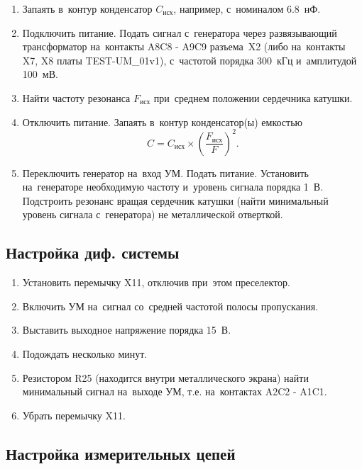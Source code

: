 \begin{enumerate}
	\item Запаять в~контур конденсатор $C_{\text{исх}}$, например, с~номиналом 6.8~нФ.
	\item Подключить питание. Подать сигнал с~генератора через развязывающий трансформатор на~контакты A8C8 - A9C9 разъема~X2 (либо на~контакты X7, X8 платы TEST-UM\_01v1), с~частотой порядка 300~кГц и~амплитудой 100~мВ.
	\item Найти частоту резонанса $F_{\text{исх}}$ при~среднем положении сердечника катушки.
	\item Отключить питание. Запаять в~контур конденсатор(ы) емкостью 
	\begin{equation}
		C = C_{\text{исх}} \times  \left( \frac{F_{\text{исх}}}{F} \right)^ 2.
	\end{equation}
	\item Переключить генератор на~вход УМ. Подать питание. Установить на~генераторе необходимую частоту и~уровень сигнала порядка 1~В. Подстроить резонанс вращая сердечник катушки (найти минимальный уровень сигнала с~генератора) не металлической отверткой.
\end{enumerate}



\subsection{Настройка диф. системы}

\begin{enumerate}
	\item Установить перемычку X11, отключив при~этом преселектор.
	\item Включить УМ на~сигнал со~средней частотой полосы пропускания.
	\item Выставить выходное напряжение порядка 15~В.
	\item Подождать несколько минут.
	\item Резистором R25 (находится внутри металлического экрана) найти минимальный сигнал на~выходе УМ, т.е. на~контактах A2C2 - A1C1.
	\item Убрать перемычку X11.
\end{enumerate}



\subsection{Настройка измерительных цепей}

